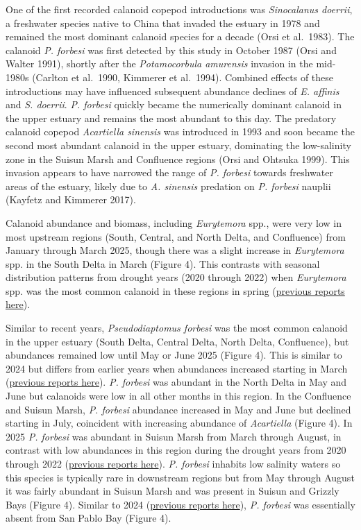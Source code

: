 \documentclass[
  letterpaper,
]{article}
\begin{document}
One of the first recorded calanoid copepod introductions was
\emph{Sinocalanus doerrii}, a freshwater species native to China that
invaded the estuary in 1978 and remained the most dominant calanoid
species for a decade (Orsi et al.~1983). The calanoid \emph{P. forbesi}
was first detected by this study in October 1987 (Orsi and Walter 1991),
shortly after the \emph{Potamocorbula amurensis} invasion in the
mid-1980s (Carlton et al.~1990, Kimmerer et al.~1994). Combined effects
of these introductions may have influenced subsequent abundance declines
of \emph{E. affinis} and \emph{S. doerrii}. \emph{P. forbesi} quickly
became the numerically dominant calanoid in the upper estuary and
remains the most abundant to this day. The predatory calanoid copepod
\emph{Acartiella sinensis} was introduced in 1993 and soon became the
second most abundant calanoid in the upper estuary, dominating the
low-salinity zone in the Suisun Marsh and Confluence regions (Orsi and
Ohtsuka 1999). This invasion appears to have narrowed the range of
\emph{P. forbesi} towards freshwater areas of the estuary, likely due to
\emph{A. sinensis} predation on \emph{P. forbesi} nauplii (Kayfetz and
Kimmerer 2017).

Calanoid abundance and biomass, including \emph{Eurytemora} spp., were
very low in most upstream regions (South, Central, and North Delta, and
Confluence) from January through March 2025, though there was a slight
increase in \emph{Eurytemora} spp. in the South Delta in March (Figure
4). This contrasts with seasonal distribution patterns from drought
years (2020 through 2022) when \emph{Eurytemora} spp. was the most
common calanoid in these regions in spring
(\href{https://github.com/emp-dwr/emp-website/tree/main/admin/archive/zoop}{previous
reports here}).

Similar to recent years, \emph{Pseudodiaptomus forbesi} was the most
common calanoid in the upper estuary (South Delta, Central Delta, North
Delta, Confluence), but abundances remained low until May or June 2025
(Figure 4). This is similar to 2024 but differs from earlier years when
abundances increased starting in March
(\href{https://github.com/emp-dwr/emp-website/tree/main/admin/archive/zoop}{previous
reports here}). \emph{P. forbesi} was abundant in the North Delta in May
and June but calanoids were low in all other months in this region. In
the Confluence and Suisun Marsh, \emph{P. forbesi} abundance increased
in May and June but declined starting in July, coincident with
increasing abundance of \emph{Acartiella} (Figure 4). In 2025 \emph{P.
forbesi} was abundant in Suisun Marsh from March through August, in
contrast with low abundances in this region during the drought years
from 2020 through 2022
(\href{https://github.com/emp-dwr/emp-website/tree/main/admin/archive/zoop}{previous
reports here}). \emph{P. forbesi} inhabits low salinity waters so this
species is typically rare in downstream regions but from May through
August it was fairly abundant in Suisun Marsh and was present in Suisun
and Grizzly Bays (Figure 4). Similar to 2024
(\href{https://github.com/emp-dwr/emp-website/tree/main/admin/archive/zoop}{previous
reports here}), \emph{P. forbesi} was essentially absent from San Pablo
Bay (Figure 4).
\end{document}
